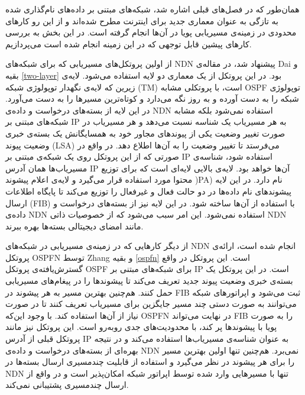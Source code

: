

همان‌طور که در فصل‌های قبلی اشاره شد، شبکه‌های مبتنی بر داده‌‌های نام‌گذاری شده به تازگی به عنوان معماری جدید برای اینترنت مطرح شده‌اند و از این رو کارهای محدودی در زمینه‌ی مسیریابی پویا در آن‌ها انجام گرفته است. در این بخش به بررسی کارهای پیشین قابل توجهی که در این زمینه انجام شده است می‌پردازیم.

از اولین پروتکل‌های مسیریابی که برای شبکه‌های NDN پیشنهاد شد، در مقاله‌ی Dai و بقیه \ref{two-layer} بود. در این پروتکل از یک معماری دو لایه استفاده می‌شود. لایه‌ی زیرین که لایه‌ی نگهدار توپولوژی شبکه  (TM) است، با پروتکلی مشابه OSPF توپولوژی شبکه را به دست آورده و به روز نگه می‌دارد و کوتاه‌ترین مسیرها را به دست می‌آورد. در این لایه از بسته‌های درخواست و داده‌ی NDN استفاده نمی‌شود بلکه مشابه شبکه‌های مبتنی بر IP به هر مسیریاب یک شناسه نسبت می‌دهد و هر مسیریاب در صورت تغییر وضعیت یکی از پیوند‌‌های مجاور خود به همسایگانش یک بسته‌ی خبری وضعیت پیوند  (LSA) می‌فرستد تا تغییر وضعیت را به آن‌ها اطلاع دهد. در واقع در صورتی که از این پروتکل روی یک شبکه‌ی مبتنی بر IP استفاده شود، شناسه‌ی مسیریاب‌ها همان آدرس IP آن‌ها خواهد بود. لایه‌ی بالایی لایه‌ای است که برای توزیع محتوا مورد استفاده قرار می‌گیرد و لایه‌ی اعلام پیشوند   )PA) نام دارد. در این لایه پیشوند‌های نام داده‌ها در دو حالت فعال و غیرفعال را توزیع می‌کند تا پایگاه اطلاعات ارسال (FIB) با استفاده از آن‌ها ساخته شود. در این لایه نیز از بسته‌های درخواست و داده‌ی NDN استفاده نمی‌شود. این امر سبب می‌شود که از خصوصیات ذاتی NDN مانند امضای دیجیتالی بسته‌ها بهره ببرند.

از دیگر کارهایی که در زمینه‌ی مسیریابی در شبکه‌های NDN انجام شده است، ارائه‌ی پروتکل OSPFN توسط Zhang و بقیه \ref{ospfn} است. این پروتکل در واقع گسترش‌یافته‌ی پروتکل OSPF برای شبکه‌های مبتنی بر IP است. در این پروتکل یک بسته‌ی خبری وضعیت پیوند جدید تعریف می‌کند تا پیشوند‌ها را در پیغام‌های مسیریابی حمل کنند. هم‌چنین بهترین مسیر به هر پیشوند در FIB ثبت می‌شود و اپراتورهای شبکه می‌توانند به صورت دستی چند مسیر جایگزین برای مسیریاب تعریف کنند تا در صورت نیاز از آن‌ها استفاده کند. با وجود این‌که OSPFN در نهایت می‌تواند FIB را به صورت پویا با پیشوندها پر کند، با محدودیت‌های جدی روبه‌رو است. این پروتکل نیز مانند پروتکل قبلی از آدرس IP به عنوان شناسه‌ی مسیریاب‌ها استفاده می‌کند و در نتیجه بهره‌ای از بسته‌های درخواست و داده‌ی NDN نمی‌برد. هم‌چنین تنها اولین بهترین مسیر را برای هر پیشوند در نظر می‌گیرد و استفاده از قابلیت چندمسیری ارسال بسته‌ها در NDN تنها با مسیرهایی وارد شده توسط اپراتور شبکه امکان‌پذیر است و در واقع از ارسال چندمسیری پشتیبانی نمی‌کند.

